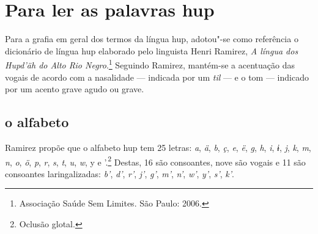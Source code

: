 \chapter{Para ler as palavras hup}

Para a grafia em geral dos termos da língua hup, adotou"-se como
referência o dicionário de língua hup elaborado pelo linguista Henri
Ramirez, \textit{A língua dos Hupd'äh do Alto Rio Negro}.\footnote{Associação Saúde
Sem Limites. São Paulo: 2006.} Seguindo Ramirez, mantém-se a acentuação
das vogais de acordo com a nasalidade --- indicada por um \textit{til} --- e o tom --- indicado por um acento grave agudo ou grave.

\section{o alfabeto}

Ramirez propõe que o alfabeto hup tem 25 letras: \textit{a}, \textit{ä}, \textit{b}, \textit{ç}, \textit{e}, \textit{ë}, \textit{g},
\textit{h}, \textit{i}, \textit{ɨ}, \textit{j}, \textit{k}, \textit{m}, \textit{n}, \textit{o}, \textit{ö}, \textit{p}, \textit{r}, \textit{s}, \textit{t}, \textit{u}, \textit{w}, y e '.\footnote{Oclusão
glotal.} Destas, 16 são consoantes, nove são vogais e 11 são consoantes
laringalizadas: \textit{b'}, \textit{d'}, \textit{r'}, \textit{j'}, \textit{g'}, \textit{m'}, \textit{n'}, \textit{w'}, \textit{y'}, \textit{s'}, \textit{k'}.

